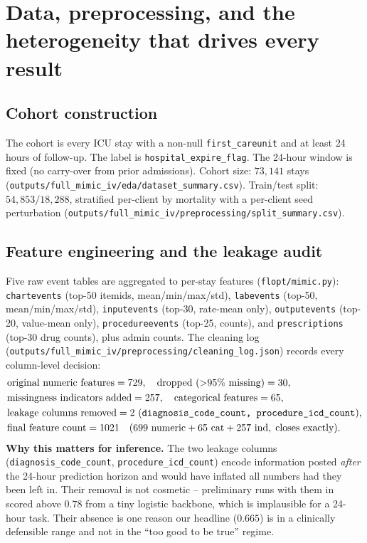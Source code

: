 \section{Data, preprocessing, and the heterogeneity that drives every result}
\label{sec:data}

\subsection{Cohort construction}
The cohort is every \mimic{} ICU stay with a non-null
\texttt{first\_careunit} and at least 24 hours of follow-up. The label is
\texttt{hospital\_expire\_flag}. The 24-hour window is fixed (no carry-over from
prior admissions). Cohort size: $73{,}141$ stays
(\texttt{outputs/full\_mimic\_iv/eda/dataset\_summary.csv}). Train/test split:
$54{,}853 / 18{,}288$, stratified per-client by mortality with a per-client
seed perturbation
(\texttt{outputs/full\_mimic\_iv/preprocessing/split\_summary.csv}).

\subsection{Feature engineering and the leakage audit}
Five raw event tables are aggregated to per-stay features
(\texttt{flopt/mimic.py}):
\texttt{chartevents} (top-50 itemids, mean/min/max/std), \texttt{labevents}
(top-50, mean/min/max/std), \texttt{inputevents} (top-30, rate-mean only),
\texttt{outputevents} (top-20, value-mean only), \texttt{procedureevents}
(top-25, counts), and \texttt{prescriptions} (top-30 drug counts), plus admin
counts. The cleaning log
(\texttt{outputs/full\_mimic\_iv/preprocessing/cleaning\_log.json}) records every
column-level decision:
\[
\begin{aligned}
&\text{original numeric features} = 729, \quad
\text{dropped (>95\% missing)} = 30, \\
&\text{missingness indicators added} = 257, \quad
\text{categorical features} = 65, \\
&\text{leakage columns removed} = 2 \text{ (\texttt{diagnosis\_code\_count, procedure\_icd\_count})}, \\
&\text{final feature count} = 1021 \quad
(699 \text{ numeric} + 65 \text{ cat} + 257 \text{ ind}, \;\text{closes exactly}).
\end{aligned}
\]
\textbf{Why this matters for inference.} The two leakage columns
(\texttt{diagnosis\_code\_count}, \texttt{procedure\_icd\_count}) encode
information posted \emph{after} the 24-hour prediction horizon and would have
inflated all numbers had they been left in. Their removal is not cosmetic --
preliminary runs with them in scored \auprc{} above $0.78$ from a tiny logistic
backbone, which is implausible for a 24-hour task. Their absence is one reason
our headline \auprc{} ($0.665$) is in a clinically defensible range and not in
the ``too good to be true'' regime.

